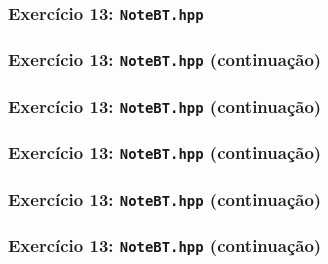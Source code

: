 \documentclass[aspectratio=169]{beamer}
\begin{document}
\begin{frame}[fragile]\frametitle{Exercício 13: \texttt{NoteBT.hpp}}
\fontsize{3pt}{5pt}\selectfont{

}
\end{frame}

\begin{frame}[fragile]\frametitle{Exercício 13: \texttt{NoteBT.hpp} (continuação)}
\fontsize{3pt}{5pt}\selectfont{

}
\end{frame}

\begin{frame}[fragile]\frametitle{Exercício 13: \texttt{NoteBT.hpp} (continuação)}
\fontsize{3pt}{5pt}\selectfont{

}
\end{frame}

\begin{frame}[fragile]\frametitle{Exercício 13: \texttt{NoteBT.hpp} (continuação)}
\fontsize{3pt}{5pt}\selectfont{

}
\end{frame}

\begin{frame}[fragile]\frametitle{Exercício 13: \texttt{NoteBT.hpp} (continuação)}
\fontsize{3pt}{5pt}\selectfont{

}
\end{frame}

\begin{frame}[fragile]\frametitle{Exercício 13: \texttt{NoteBT.hpp} (continuação)}
\fontsize{3pt}{5pt}\selectfont{

}
\end{frame}
\end{document}

